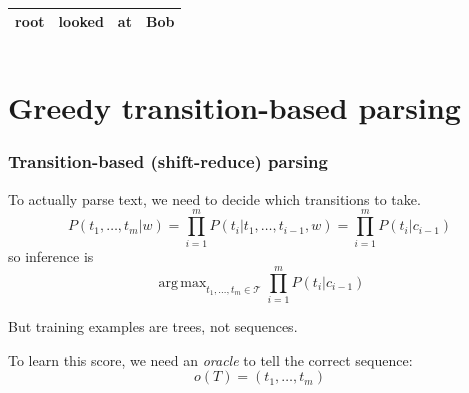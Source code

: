 \documentclass[t]{beamer}
\DeclareMathOperator*{\argmax}{arg\,max}
\begin{document}
\begin{frame}
{\begin{varwidth}{2.2\linewidth}
{\begin{dependency}
\begin{deptext}[column sep=.7cm]
	\end{deptext}
	\end{dependency}
	\\
	\begin{tabular}{|l|l|l|l|}\hline
	\color{red} root & \color{red} looked & \color{red} at & \color{red} Bob \\ \hline
	\end{tabular}
	\hspace{6mm}
	\begin{tabular}{|l|}\hline
	\quad \\ \hline
	\end{tabular}
	}
    \end{varwidth}
	}
\end{frame}

\section{Greedy transition-based parsing}

\begin{frame}
  \frametitle{Transition-based (shift-reduce) parsing}
    To actually parse text, we need to decide which transitions to take.
    \[
        P(t_1,\ldots,t_m|w)=\prod_{i=1}^mP(t_i|t_1,\ldots,t_{i-1},w)=\prod_{i=1}^mP(t_i|c_{i-1})
    \]
    so inference is
    \[
    \argmax_{t_1,\ldots,t_m \in \mathcal{T}} \prod_{i=1}^mP(t_i|c_{i-1})
    \]

    But training examples are trees, not sequences.
    
    To learn this score, we need an \textit{oracle} to tell the correct sequence:
    \[
    o(T)=(t_1,\ldots,t_m)
    \]
    
    \pause\vfill
    
    \centering
\end{frame}
\end{document}
